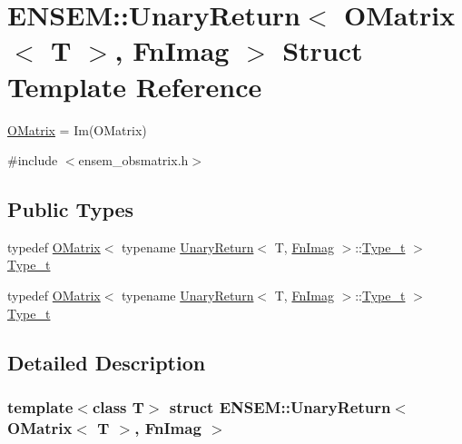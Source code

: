 \hypertarget{structENSEM_1_1UnaryReturn_3_01OMatrix_3_01T_01_4_00_01FnImag_01_4}{}\section{E\+N\+S\+EM\+:\+:Unary\+Return$<$ O\+Matrix$<$ T $>$, Fn\+Imag $>$ Struct Template Reference}
\label{structENSEM_1_1UnaryReturn_3_01OMatrix_3_01T_01_4_00_01FnImag_01_4}


\mbox{\hyperlink{classENSEM_1_1OMatrix}{O\+Matrix}} = Im(\+O\+Matrix)  




{\ttfamily \#include $<$ensem\+\_\+obsmatrix.\+h$>$}

\subsection*{Public Types}
\begin{DoxyCompactItemize}
\item 
typedef \mbox{\hyperlink{classENSEM_1_1OMatrix}{O\+Matrix}}$<$ typename \mbox{\hyperlink{structENSEM_1_1UnaryReturn}{Unary\+Return}}$<$ T, \mbox{\hyperlink{structENSEM_1_1FnImag}{Fn\+Imag}} $>$\+::\mbox{\hyperlink{structENSEM_1_1UnaryReturn_3_01OMatrix_3_01T_01_4_00_01FnImag_01_4_a0841f7311ee5495c55d754fd855f045c}{Type\+\_\+t}} $>$ \mbox{\hyperlink{structENSEM_1_1UnaryReturn_3_01OMatrix_3_01T_01_4_00_01FnImag_01_4_a0841f7311ee5495c55d754fd855f045c}{Type\+\_\+t}}
\item 
typedef \mbox{\hyperlink{classENSEM_1_1OMatrix}{O\+Matrix}}$<$ typename \mbox{\hyperlink{structENSEM_1_1UnaryReturn}{Unary\+Return}}$<$ T, \mbox{\hyperlink{structENSEM_1_1FnImag}{Fn\+Imag}} $>$\+::\mbox{\hyperlink{structENSEM_1_1UnaryReturn_3_01OMatrix_3_01T_01_4_00_01FnImag_01_4_a0841f7311ee5495c55d754fd855f045c}{Type\+\_\+t}} $>$ \mbox{\hyperlink{structENSEM_1_1UnaryReturn_3_01OMatrix_3_01T_01_4_00_01FnImag_01_4_a0841f7311ee5495c55d754fd855f045c}{Type\+\_\+t}}
\end{DoxyCompactItemize}


\subsection{Detailed Description}
\subsubsection*{template$<$class T$>$\newline
struct E\+N\+S\+E\+M\+::\+Unary\+Return$<$ O\+Matrix$<$ T $>$, Fn\+Imag $>$}

